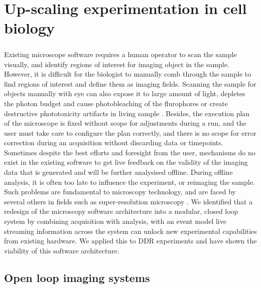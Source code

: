 \chapter{Up-scaling experimentation in cell biology}
\paragraph*{} Existing microscope software requires a human operator to scan the sample visually, and identify regions of interest for imaging object in the sample. However, it is difficult for the biologist to manually comb through the sample to find regions of interest and define them as imaging fields. Scanning the sample for objects manually with eye can also expose it to large amount of light, depletes the photon budget and cause photobleaching of the flurophores or create destructive phototoxicity artifacts in living sample \cite{scherf2015smart}. Besides, the execution plan of the microscope is fixed without scope for adjustments during a run, and the user must take care to configure the plan correctly, and there is no scope for error correction during an acquisition without discarding data or timepoints. Sometimes despite the best efforts and foresight from the user, mechanisms do no exist in the existing software to get live feedback on the validity of the imaging data that is generated and will be further analysised offline. During offline analysis, it is often too late to influence the experiment, or reimaging the sample. Such problems are fundamental to microscopy technology, and are faced by several others in fields such as super-resolution microscopy \cite{D1SC05506B}. We identified that a redesign of the microscopy software architecture into a modular, closed loop system by combining acquisition with analysis, with an event model live streaming information across the system can unlock new experimental capabilities from existing hardware. We applied this to DDR experiments and have shown the viability of this software architecture.


\section{Open loop imaging systems}
